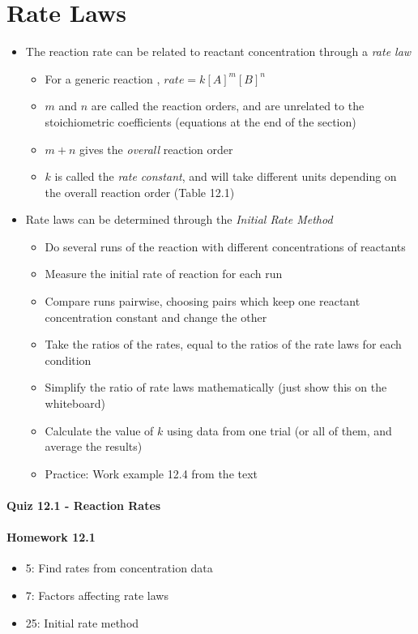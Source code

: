 \documentclass[12pt, openany, letterpaper]{memoir}
\begin{document}
\section{Rate Laws}
\begin{itemize}
  \item The reaction rate can be related to reactant concentration through a \emph{rate law}
    \begin{itemize}
      \item For a generic reaction , $rate=k\left[A\right]^m\left[B\right]^n$
      \item $m$ and $n$ are called the reaction orders, and are unrelated to the stoichiometric coefficients (equations at the end of the section)
      \item $m+n$ gives the \emph{overall} reaction order
      \item $k$ is called the \emph{rate constant}, and will take different units depending on the overall reaction order (Table 12.1)
    \end{itemize}
  \item Rate laws can be determined through the \emph{Initial Rate Method}
    \begin{itemize}
      \item Do several runs of the reaction with different concentrations of reactants
      \item Measure the initial rate of reaction for each run
      \item Compare runs pairwise, choosing pairs which keep one reactant concentration constant and change the other
      \item Take the ratios of the rates, equal to the ratios of the rate laws for each condition
      \item Simplify the ratio of rate laws mathematically (just show this on the whiteboard)
      \item Calculate the value of $k$ using data from one trial (or all of them, and average the results)
      \item Practice: Work example 12.4 from the text
    \end{itemize}
\end{itemize}

\paragraph*{Quiz 12.1 - Reaction Rates}
\paragraph*{Homework 12.1}
\begin{itemize}
  \item 5: Find rates from concentration data 
  \item 7: Factors affecting rate laws
  \item 25: Initial rate method
\end{itemize}
\end{document}
